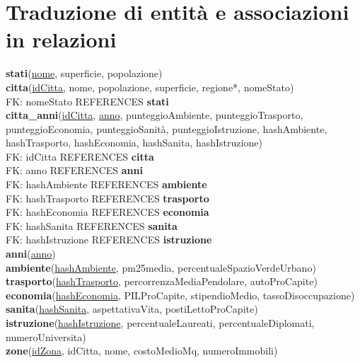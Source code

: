 \documentclass[a4paper,12pt]{report}
\begin{document}
        \section{Traduzione di entità e associazioni in relazioni}
        \onehalfspacing
        \textbf{stati}(\underline{nome}, superficie, popolazione) \\
        \textbf{citta}(\underline{idCitta}, nome, popolazione, superficie, regione*, nomeStato) \\ 
            \null\quad\quad FK: nomeStato REFERENCES \textbf{stati} \\
        \textbf{citta\_anni}(\underline{idCitta}, \underline{anno}, punteggioAmbiente, punteggioTrasporto, punteggioEconomia, punteggioSanità, punteggioIstruzione, hashAmbiente, hashTrasporto, hashEconomia, hashSanita, hashIstruzione) \\
            \null\quad\quad FK: idCitta REFERENCES \textbf{citta} \\
            \null\quad\quad FK: anno REFERENCES \textbf{anni} \\
            \null\quad\quad FK: hashAmbiente REFERENCES \textbf{ambiente} \\
            \null\quad\quad FK: hashTrasporto REFERENCES \textbf{trasporto} \\
            \null\quad\quad FK: hashEconomia REFERENCES \textbf{economia} \\
            \null\quad\quad FK: hashSanita REFERENCES \textbf{sanita} \\
            \null\quad\quad FK: hashIstruzione REFERENCES \textbf{istruzione} \\
        \textbf{anni}(\underline{anno}) \\
        \textbf{ambiente}(\underline{hashAmbiente}, pm25media, percentualeSpazioVerdeUrbano) \\
        \textbf{trasporto}(\underline{hashTrasporto}, percorrenzaMediaPendolare, autoProCapite) \\
        \textbf{economia}(\underline{hashEconomia}, PILProCapite, stipendioMedio, tassoDisoccupazione) \\
        \textbf{sanita}(\underline{hashSanita}, aspettativaVita, postiLettoProCapite) \\
        \textbf{istruzione}(\underline{hashIstruzione}, percentualeLaureati, percentualeDiplomati, numeroUniversita) \\
        \textbf{zone}(\underline{idZona}, idCitta, nome, costoMedioMq, numeroImmobili) \\
\end{document}
